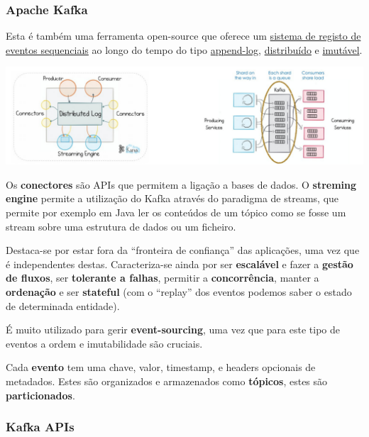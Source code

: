 \documentclass{article}
\begin{document}
\subsubsection{Apache Kafka}

Esta é também uma ferramenta open-source que oferece um \uline{sistema de registo de eventos
sequenciais} ao longo do tempo do tipo \uline{append-log}, \uline{distribuído} e \uline{imutável}.

\pagebreak

\begin{center}
  \includegraphics[scale=0.6]{112}
\end{center}

Os \textbf{conectores} são APIs que permitem a ligação a bases de dados. O \textbf{streming engine} permite a utilização do Kafka
através do paradigma de streams, que permite por exemplo em Java ler os conteúdos de um tópico como se fosse um
stream sobre uma estrutura de dados ou um ficheiro.

\vspace{2mm}

Destaca-se por estar fora da “fronteira de confiança” das aplicações, uma vez que é
independentes destas. Caracteriza-se ainda por ser \textbf{escalável} e fazer a \textbf{gestão de fluxos}, ser
\textbf{tolerante a falhas}, permitir a \textbf{concorrência}, manter a \textbf{ordenação} e ser \textbf{stateful} (com o “replay”
dos eventos podemos saber o estado de determinada entidade).

É muito utilizado para gerir \textbf{event-sourcing}, uma vez que para este tipo de eventos a ordem e imutabilidade são
cruciais.

\vspace{2mm}

Cada \textbf{evento} tem uma chave, valor, timestamp, e headers opcionais
de metadados. Estes são organizados e armazenados como \textbf{tópicos}, estes
são \textbf{particionados}.

\subsubsection{Kafka APIs}
\end{document}

